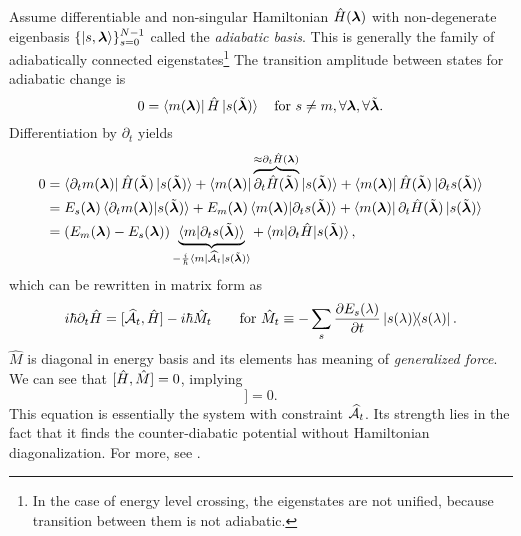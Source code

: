 Assume differentiable and non-singular Hamiltonian $\HH(\llambda)$ with non-degenerate eigenbasis $\{\ket{s,\llambda}\}_{s=0}^{N-1}$ called the \emph{adiabatic basis}. This is generally the family of adiabatically connected eigenstates\footnote{In the case of energy level crossing, the eigenstates are not unified, because transition between them is not adiabatic.} The transition amplitude between states for adiabatic change is
\begin{equation}
    0=\bra{m(\llambda)}\HH\ket{s(\tilde\llambda)} \quad \text{for }s\neq m, \forall \llambda,\forall \tilde \llambda.
\end{equation}
Differentiation by $\partial_t$ yields
\begin{equation}
    \begin{split}
        0&=\bra{\partial_t m(\llambda)}\HH(\tilde \llambda)\ket{s(\tilde\llambda)}+ \bra{m(\llambda)}\overbrace{\partial_t\HH(\tilde \llambda)}^{\approx \partial_t\HH(\llambda)}\ket{s(\tilde\llambda)}+ \bra{m(\llambda)}\HH(\tilde \llambda)\ket{\partial_t s(\tilde \llambda)}\\
        &=E_s(\llambda)\braket{\partial_t m(\llambda)|s(\tilde \llambda)} + E_m(\llambda)\braket{m(\llambda)|\partial_t s(\tilde \llambda)}+ \bra{m(\llambda)}\partial_t \HH(\tilde\llambda)\ket{s(\tilde \llambda)}\\
        &= (E_m(\llambda)-E_s(\llambda))\underbrace{\braket{m|\partial_t s(\tilde \llambda)}}_{-\frac{i}{\hbar}\bra{m}\AA_t\ket{s(\tilde \llambda)}} + \braket{m|\partial_t\HH|s(\tilde \llambda)},
    \end{split}
\end{equation}
which can be rewritten in matrix form as
\begin{equation}
    i\hbar\partial_t\HH=[\AA_t,\HH]-i\hbar \hat{M}_t\qquad \text{for } \hat{M}_t\equiv -\sum_s\pder{E_s(\lambda)}{t}\ket{s(\lambda)}\!\!\bra{s(\lambda)}.
\end{equation}
$\hat{M}$ is diagonal in energy basis and its elements has meaning of \emph{generalized force}. We can see that $[\HH,\hat{M}]=0$, implying
\begin{equation}
    [\HH,i\hbar\partial_t\HH-[\AA_t,\HH]]=0.
    \label{eq:komutation}
\end{equation}
This equation is essentially the system with constraint $\AA_t$. Its strength lies in the fact that it finds the counter-diabatic potential without Hamiltonian diagonalization. For more, see \citet[Chap. 2.3]{kolodrubez}.










